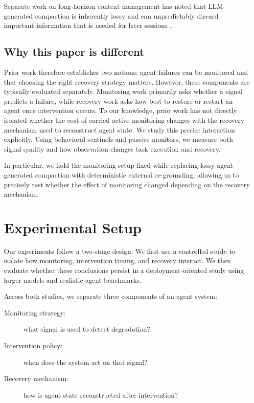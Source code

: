\documentclass{article}
\begin{document}
Separate work on long-horizon context management has noted that LLM-generated compaction is inherently lossy and can unpredictably discard important information that is needed for later sessions \citep{semenov2026compaction}.

\subsection{Why this paper is different}

Prior work therefore establishes two notions: agent failures can be monitored and that choosing the right recovery strategy matters. However, these components are typically evaluated separately. Monitoring work primarily asks whether a signal predicts a failure, while recovery work asks how best to restore or restart an agent once intervention occurs. To our knowledge, prior work has not directly isolated whether the cost of carried active monitoring changes with the recovery mechanism used to reconstruct agent state. We study this precise interaction explicitly. Using behavioral sentinels and passive monitors, we measure both signal quality and how observation changes task execution and recovery.

In particular, we hold the monitoring setup fixed while replacing lossy agent-generated compaction with deterministic external re-grounding, allowing us to precisely test whether the effect of monitoring changed depending on the recovery mechanism.

\section{Experimental Setup}

Our experiments follow a two-stage design. We first use a controlled study to isolate how monitoring, intervention timing, and recovery interact. We then evaluate whether these conclusions persist in a deployment-oriented study using larger models and realistic agent benchmarks.

Across both studies, we separate three components of an agent system:
\begin{description}
  \item[Monitoring strategy:] what signal is used to detect degradation?
  \item[Intervention policy:] when does the system act on that signal?
  \item[Recovery mechanism:] how is agent state reconstructed after intervention?
\end{description}
\end{document}
